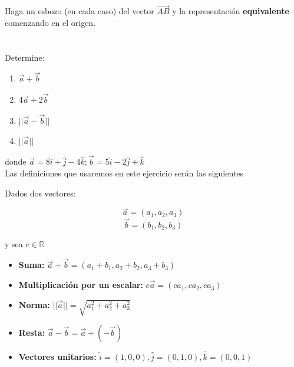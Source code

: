 \documentclass[12pt]{article}
\begin{document}
Haga un esbozo (en cada caso) del vector $\vec{AB}$ y la representación \textbf{equivalente} comenzando en el origen.

\section{}

Determine:

\begin{enumerate}[format=\textbf]
  
\item $\vec{a} + \vec{b}$
  
\item $4 \vec{a} + 2\vec{b}$

\item $||\vec{a} - \vec{b}||$

\item $||\vec{a}||$

\end{enumerate}

donde $\vec{a}=8\hat{i} + \hat{j} - 4\hat{k}; \vec{b}= 5\hat{i} - 2\hat{j} +\hat{k}$ \\

Las definiciones que usaremos en este ejercicio serán las siguientes

Dados dos vectores:

\[ \vec{a} = (a_1, a_2, a_3) \]
\[ \vec{b} = (b_1,b_2, b_3) \]

y sea $c \in \mathds{R}$

\begin{itemize}
  
\item \textbf{Suma:} $\vec{a} + \vec{b}  = (a_1 + b_1, a_2+b_2, a_3+b_3)$
  
\item \textbf{Multiplicación por un escalar:} $c\vec{a} = (ca_1, ca_2, ca_3)$
  
\item \textbf{Norma:} $||\vec{a}|| = \sqrt{a_1^2 + a_2^2 + a_3^2}$
  
\item \textbf{Resta:}  $\vec{a} - \vec{b} = \vec{a} + (-\vec{b})$
  
\item \textbf{Vectores unitarios:} $\hat{i} = (1, 0, 0),  \hat{j} = (0, 1, 0),  \hat{k} = (0, 0, 1)$

\end{itemize}
\end{document}
